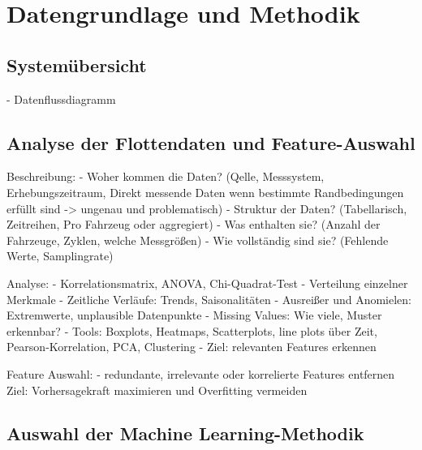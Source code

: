 
\chapter{Datengrundlage und Methodik}

\section{Systemübersicht}

- Datenflussdiagramm

\section{Analyse der Flottendaten und Feature-Auswahl}

Beschreibung:
- Woher kommen die Daten? (Qelle, Messsystem, Erhebungszeitraum, Direkt messende Daten wenn bestimmte Randbedingungen erfüllt sind -> ungenau und problematisch)
- Struktur der Daten? (Tabellarisch, Zeitreihen, Pro Fahrzeug oder aggregiert)
- Was enthalten sie? (Anzahl der Fahrzeuge, Zyklen, welche Messgrößen)
- Wie vollständig sind sie? (Fehlende Werte, Samplingrate)

Analyse:
- Korrelationsmatrix, ANOVA, Chi-Quadrat-Test
- Verteilung einzelner Merkmale
- Zeitliche Verläufe: Trends, Saisonalitäten
- Ausreißer und Anomielen: Extremwerte, unplausible Datenpunkte
- Missing Values: Wie viele, Muster erkennbar?
- Tools: Boxplots, Heatmaps, Scatterplots, line plots über Zeit, Pearson-Korrelation, PCA, Clustering
- Ziel: relevanten Features erkennen

Feature Auswahl:
- redundante, irrelevante oder korrelierte Features entfernen
Ziel: Vorhersagekraft maximieren und Overfitting vermeiden

\section{Auswahl der Machine Learning-Methodik}